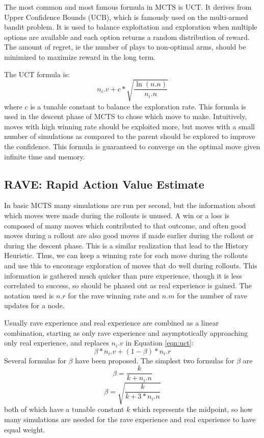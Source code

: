 The most common and most famous formula in MCTS is UCT. It derives from Upper Confidence Bounds (UCB), which is famously used on the multi-armed bandit problem. It is used to balance exploitation and exploration when multiple options are available and each option returns a random distribution of reward. The amount of regret, ie the number of plays to non-optimal arms, should be minimized to maximize reward in the long term.

The UCT formula is:
\begin{equation}\label{eqn:uct} n_i.v + c*\sqrt{\frac{\ln(n.n)}{n_i.n}}\end{equation}
where $c$ is a tunable constant to balance the exploration rate. This formula is used in the descent phase of MCTS to chose which move to make. Intuitively, moves with high winning rate should be exploited more, but moves with a small number of simulations as compared to the parent should be explored to improve the confidence. This formula is guaranteed to converge on the optimal move given infinite time and memory.




\subsection{RAVE: Rapid Action Value Estimate}\label{sec:rave}

In basic MCTS many simulations are run per second, but the information about which moves were made during the rollouts is unused. A win or a loss is composed of many moves which contributed to that outcome, and often good moves during a rollout are also good moves if made earlier during the rollout or during the descent phase. This is a similar realization that lead to the History Heuristic. Thus, we can keep a winning rate for each move during the rollouts and use this to encourage exploration of moves that do well during rollouts. This information is gathered much quicker than pure experience, though it is less correlated to success, so should be phased out as real experience is gained. The notation used is $n.r$ for the rave winning rate and $n.m$ for the number of rave updates for a node.

Usually rave experience and real experience are combined as a linear combination, starting as only rave experience and asymptotically approaching only real experience, and replaces $n_i.v$ in Equation \ref{eqn:uct}:
\begin{equation}\label{eqn:rave1} \beta*n_i.v + (1-\beta)*n_i.r \end{equation}
Several formulas for $\beta$ have been proposed. The simplest two formulas for $\beta$ are
\begin{equation}\label{eqn:rave2} \beta = \frac{k}{k+n_i.n} \end{equation}
\begin{equation}\label{eqn:rave3} \beta = \sqrt{\frac{k}{k+3*n_i.n}} \end{equation}
 both of which have a tunable constant $k$ which represents the midpoint, so how many simulations are needed for the rave experience and real experience to have equal weight.

